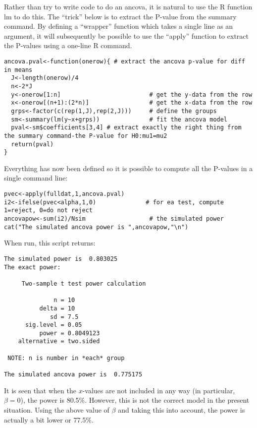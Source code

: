 \documentclass[12pt,a4paper]{article}
\theoremstyle{regla}
\theoremstyle{remark}
\theoremstyle{definition}
\theoremstyle{nonumberbreak}
\begin{document}
\begin{xmpl}
Rather than try to write code to do an ancova, it is natural to use the R function lm to do this.  The ``trick'' below is to extract the P-value from the summary command.  By defining a ``wrapper'' function which takes a single line as an argument, it will subsequently be possible to use the ``apply'' function to extract the P-values using a one-line R command.

\begin{lstlisting}
ancova.pval<-function(onerow){ # extract the ancova p-value for diff in means
  J<-length(onerow)/4
  n<-2*J
  y<-onerow[1:n]                         # get the y-data from the row
  x<-onerow[(n+1):(2*n)]                 # get the x-data from the row
  grps<-factor(c(rep(1,J),rep(2,J)))     # define the groups
  sm<-summary(lm(y~x+grps))              # fit the ancova model
  pval<-sm$coefficients[3,4] # extract exactly the right thing from the summary command-the P-value for H0:mu1=mu2
  return(pval)
}
\end{lstlisting}
Everything has now been defined so it is possible to compute all the P-values in a single command line:
\begin{lstlisting}
pvec<-apply(fulldat,1,ancova.pval)
i2<-ifelse(pvec<alpha,1,0)              # for ea test, compute 1=reject, 0=do not reject
ancovapow<-sum(i2)/Nsim                  # the simulated power
cat("The simulated ancova power is ",ancovapow,"\n")
\end{lstlisting}

When run, this script returns:
\begin{lstlisting}
The simulated power is  0.803025 
The exact power:

     Two-sample t test power calculation 

              n = 10
          delta = 10
             sd = 7.5
      sig.level = 0.05
          power = 0.8049123
    alternative = two.sided

 NOTE: n is number in *each* group 

The simulated ancova power is  0.775175 
\end{lstlisting}

It is seen that when the $x$-values are not included in any way (in particular, $\beta=0$), the power is 80.5\%.  However, this is not the correct model in the present situation.  Using the above value of $\beta$ and taking this into account, the power is actually a bit lower or 77.5\%.

\end{xmpl}
\end{document}
